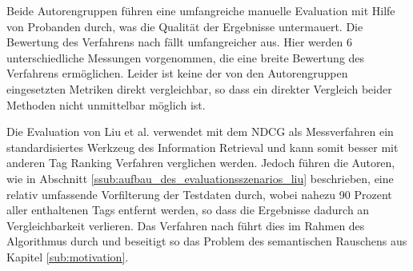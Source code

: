 Beide Autorengruppen führen eine umfangreiche manuelle Evaluation mit Hilfe von Probanden durch, was die Qualität der Ergebnisse untermauert. Die Bewertung des Verfahrens nach \cite{collectiveKnowledge} fällt umfangreicher aus. Hier werden 6 unterschiedliche Messungen vorgenommen, die eine breite Bewertung des Verfahrens ermöglichen. Leider ist keine der von den Autorengruppen eingesetzten Metriken direkt vergleichbar, so dass ein direkter Vergleich beider Methoden nicht unmittelbar möglich ist.

Die Evaluation von Liu et al. verwendet mit dem NDCG als Messverfahren ein standardisiertes Werkzeug des Information Retrieval und kann somit besser mit anderen Tag Ranking Verfahren verglichen werden. Jedoch führen die Autoren, wie in Abschnitt \ref{ssub:aufbau_des_evaluationsszenarios_liu} beschrieben, eine relativ umfassende Vorfilterung der Testdaten durch, wobei nahezu 90 Prozent aller enthaltenen Tags entfernt werden, so dass die Ergebnisse dadurch an Vergleichbarkeit verlieren. Das Verfahren nach \cite{collectiveKnowledge} führt dies im Rahmen des Algorithmus durch und beseitigt so das Problem des semantischen Rauschens aus Kapitel \ref{sub:motivation}.
